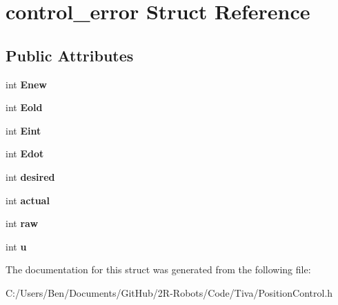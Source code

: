 \hypertarget{structcontrol__error}{}\section{control\+\_\+error Struct Reference}
\label{structcontrol__error}
\subsection*{Public Attributes}
\begin{DoxyCompactItemize}
\item 
\mbox{\label{structcontrol__error_a520d0aa203dfb6a8fc2ef6ea67742634}} 
int {\bfseries Enew}
\item 
\mbox{\label{structcontrol__error_a544db3cda64df9fdd64338941e583d3c}} 
int {\bfseries Eold}
\item 
\mbox{\label{structcontrol__error_a0134001840bac616204e9b36ce7fc53e}} 
int {\bfseries Eint}
\item 
\mbox{\label{structcontrol__error_a5a4f2cb0d9739ecbc2391462d4b0f07d}} 
int {\bfseries Edot}
\item 
\mbox{\label{structcontrol__error_a50083d46933f91ac7af1ab23eda49ddb}} 
int {\bfseries desired}
\item 
\mbox{\label{structcontrol__error_a45eeafb4f62fb62128e4f1dde8b134db}} 
int {\bfseries actual}
\item 
\mbox{\label{structcontrol__error_a872f13c1886cb584b7043e668b188548}} 
int {\bfseries raw}
\item 
\mbox{\label{structcontrol__error_aea13c87eda1433f414ce28363a3c9d07}} 
int {\bfseries u}
\end{DoxyCompactItemize}


The documentation for this struct was generated from the following file\+:\begin{DoxyCompactItemize}
\item 
C\+:/\+Users/\+Ben/\+Documents/\+Git\+Hub/2\+R-\/\+Robots/\+Code/\+Tiva/Position\+Control.\+h\end{DoxyCompactItemize}
